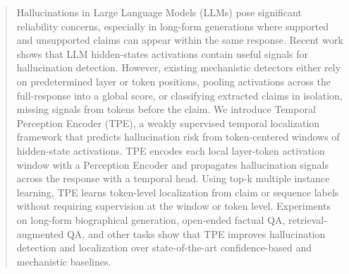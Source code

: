 \begin{abstract}
Hallucinations in Large Language Models (LLMs) pose significant reliability concerns, especially in long-form generations where supported and unsupported claims can appear within the same response. Recent work shows that LLM hidden-states activations contain useful signals for hallucination detection. However, existing mechanistic detectors either rely on predetermined layer or token positions, pooling activations across the full-response into a global score, or classifying extracted claims in isolation, missing signals from tokens before the claim. We introduce Temporal Perception Encoder (TPE), a weakly supervised temporal localization framework that predicts hallucination risk from token-centered windows of hidden-state activations. TPE encodes each local layer-token activation window with a Perception Encoder and propagates hallucination signals across the response with a temporal head. Using top-k multiple instance learning, TPE learns token-level localization from claim or sequence labels without requiring supervision at the window or token level. Experiments on long-form biographical generation, open-ended factual QA, retrieval-augmented QA, and other tasks show that TPE improves hallucination detection and localization over state-of-the-art confidence-based and mechanistic baselines.
\end{abstract}
